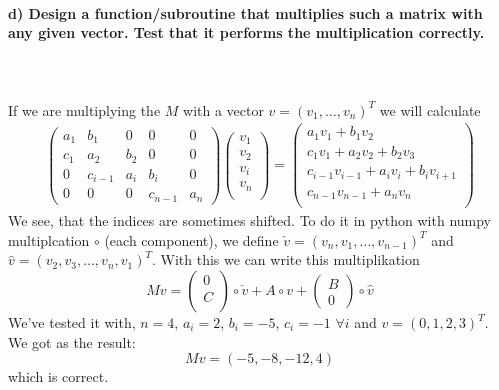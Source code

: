 \paragraph{
    d) Design a function/subroutine that multiplies such a matrix with
    any given vector. Test that it performs the multiplication correctly.
} \ \\
    \\
    If we are multiplying the $M$ with a vector $v = (v_1, \dots, v_n)^T$ we will calculate
    \begin{align}
    \begin{pmatrix}
    a_1 & b_1 & 0      & 0       & 0 \\
    c_1 & a_2 & b_2    & 0       & 0 \\
    0   & c_{i-1} & a_i & b_i    &0    \\
    0   & 0   & 0      & c_{n-1} & a_n
    \end{pmatrix}
    \begin{pmatrix}
    v_1 \\ v_2 \\v_i \\ v_n\\
    \end{pmatrix}
    =
    \begin{pmatrix}
    a_1 v_1 + b_1 v_2 \\
    c_1 v_1 + a_2 v_2 + b_2 v_3 \\
    c_{i-1} v_{i-1} + a_i v_i + b_i v_{i+1} \\
    c_{n-1} v_{n-1} + a_n v_n\\
    \end{pmatrix}
    \end{align}
    We see, that the indices are sometimes shifted. To do it in python with numpy multiplcation $\circ$ (each component), we define $\check{v} = (v_n, v_1, \dots, v_{n-1})^T$ and $\hat{v} = (v_2, v_3, \dots, v_n , v_1)^T$. With this we can write this multiplikation
    \begin{equation}
    	Mv =
    	\begin{pmatrix} 0 \\ C \\	\end{pmatrix}
    	\circ \check{v} + A \circ v +
    	\begin{pmatrix} B \\ 0	\end{pmatrix} \circ \hat{v}
    \end{equation}
    We've tested it with, $n=4$, $a_i = 2$, $b_i = -5$, $c_i = -1$ $ \forall i$ and $v = (0,1,2,3)^T$. We got as the result:
    \begin{equation}
    	Mv = (-5, -8, -12, 4)
    \end{equation}
    which is correct.
    

